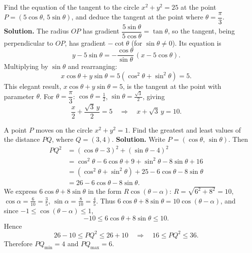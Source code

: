 \documentclass[11pt]{article}
\begin{document}
\begin{exoresolu}
Find the equation of the tangent to the circle $x^{2}+y^{2}=25$ at the point $P=(5\cos\theta,\,5\sin\theta)$, and deduce the tangent at the point where $\theta=\dfrac{\pi}{3}$.
\tcblower
\textbf{Solution.} The radius $OP$ has gradient $\dfrac{5\sin\theta}{5\cos\theta}=\tan\theta$, so the tangent, being perpendicular to $OP$, has gradient $-\cot\theta$ (for $\sin\theta\neq0$). Its equation is
\[
y-5\sin\theta=-\frac{\cos\theta}{\sin\theta}\,(x-5\cos\theta).
\]
Multiplying by $\sin\theta$ and rearranging:
\[
x\cos\theta+y\sin\theta=5(\cos^{2}\theta+\sin^{2}\theta)=5.
\]
This elegant result, $x\cos\theta+y\sin\theta=5$, is the tangent at the point with parameter $\theta$. For $\theta=\dfrac{\pi}{3}$: $\cos\theta=\tfrac12$, $\sin\theta=\tfrac{\sqrt3}{2}$, giving
\[
\frac{x}{2}+\frac{\sqrt3\,y}{2}=5
\quad\Longrightarrow\quad
x+\sqrt3\,y=10.
\]
\end{exoresolu}

\begin{exoresolu}
A point $P$ moves on the circle $x^{2}+y^{2}=1$. Find the greatest and least values of the distance $PQ$, where $Q=(3,4)$.
\tcblower
\textbf{Solution.} Write $P=(\cos\theta,\,\sin\theta)$. Then
\begin{align*}
PQ^{2}&=(\cos\theta-3)^{2}+(\sin\theta-4)^{2}\\
&=\cos^{2}\theta-6\cos\theta+9+\sin^{2}\theta-8\sin\theta+16\\
&=(\cos^{2}\theta+\sin^{2}\theta)+25-6\cos\theta-8\sin\theta\\
&=26-6\cos\theta-8\sin\theta.
\end{align*}
We express $6\cos\theta+8\sin\theta$ in the form $R\cos(\theta-\alpha)$:
$R=\sqrt{6^{2}+8^{2}}=10$, $\cos\alpha=\frac{6}{10}=\frac{3}{5}$, $\sin\alpha=\frac{8}{10}=\frac{4}{5}$.
Thus $6\cos\theta+8\sin\theta=10\cos(\theta-\alpha)$, and since $-1\leq\cos(\theta-\alpha)\leq1$,
\[
-10 \leq 6\cos\theta+8\sin\theta \leq 10.
\]
Hence
\[
26-10 \leq PQ^{2} \leq 26+10 \quad\Longrightarrow\quad 16 \leq PQ^{2} \leq 36.
\]
Therefore $PQ_{\min}=4$ and $PQ_{\max}=6$.
\end{exoresolu}
\end{document}
